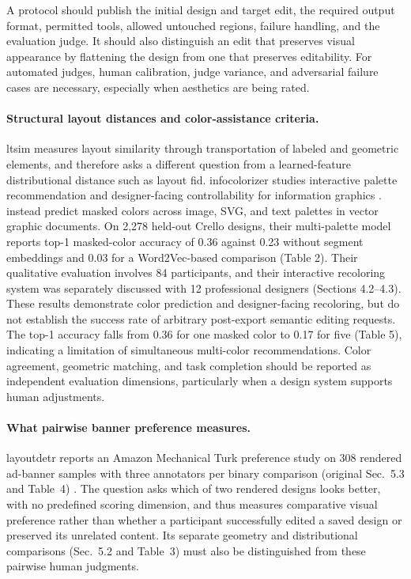 A protocol should publish the initial design and target edit, the required output format, permitted tools, allowed untouched regions, failure handling, and the evaluation judge.
It should also distinguish an edit that preserves visual appearance by flattening the design from one that preserves editability.
For automated judges, human calibration, judge variance, and adversarial failure cases are necessary, especially when aesthetics are being rated.

\paragraph{Structural layout distances and color-assistance criteria.}
\ac{ltsim} measures layout similarity through transportation of labeled and geometric elements, and therefore asks a different question from a learned-feature distributional distance such as layout \ac{fid}.
\ac{infocolorizer} studies interactive palette recommendation and designer-facing controllability for information graphics \citep{infocolorizer2021}.
\citet{qiu2023multipalette} instead predict masked colors across image, SVG, and text palettes in vector graphic documents.
On 2,278 held-out Crello designs, their multi-palette model reports top-1 masked-color accuracy of 0.36 against 0.23 without segment embeddings and 0.03 for a Word2Vec-based comparison (Table 2).
Their qualitative evaluation involves 84 participants, and their interactive recoloring system was separately discussed with 12 professional designers (Sections 4.2--4.3).
These results demonstrate color prediction and designer-facing recoloring, but do not establish the success rate of arbitrary post-export semantic editing requests.
The top-1 accuracy falls from 0.36 for one masked color to 0.17 for five (Table 5), indicating a limitation of simultaneous multi-color recommendations.
Color agreement, geometric matching, and task completion should be reported as independent evaluation dimensions, particularly when a design system supports human adjustments.

\paragraph{What pairwise banner preference measures.}
\ac{layoutdetr} reports an Amazon Mechanical Turk preference study on 308 rendered ad-banner samples with three annotators per binary comparison (original Sec.~5.3 and Table~4) \citep{layoutdetr2024}.
The question asks which of two rendered designs looks better, with no predefined scoring dimension, and thus measures comparative visual preference rather than whether a participant successfully edited a saved design or preserved its unrelated content.
Its separate geometry and distributional comparisons (Sec.~5.2 and Table~3) must also be distinguished from these pairwise human judgments.

